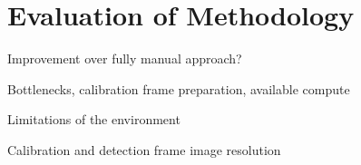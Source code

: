 \section{Evaluation of Methodology}

Improvement over fully manual approach?

Bottlenecks, calibration frame preparation, available compute

Limitations of the environment

Calibration and detection frame image resolution